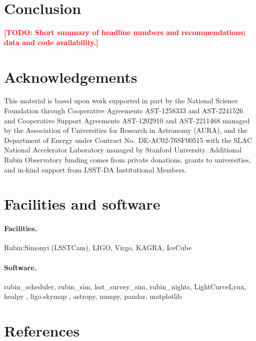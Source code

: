 \documentclass[OPS,lsstdraft,authoryear,toc]{lsstdoc}
\newcommand{\todo}[1]{\textcolor{red}{\textbf{[TODO: #1]}}}
\begin{document}
\section{Conclusion}\label{sec:conclusion}
\todo{Short summary of headline numbers and recommendations; data and code availability.}

\appendix

\section{Acknowledgements}

This material is based upon work supported in part by the National Science Foundation through Cooperative Agreements AST-1258333 and AST-2241526 and Cooperative Support Agreements AST-1202910 and AST-2211468 managed by the Association of Universities for Research in Astronomy (AURA), and the Department of Energy under Contract No.\ DE-AC02-76SF00515 with the SLAC National Accelerator Laboratory managed by Stanford University.
Additional Rubin Observatory funding comes from private donations, grants to universities, and in-kind support from LSST-DA Institutional Members.


\section{Facilities and software}

\paragraph{Facilities.} Rubin:Simonyi (LSSTCam), LIGO, Virgo, KAGRA, IceCube

\paragraph{Software.} rubin\_scheduler, rubin\_sim, lsst\_survey\_sim, rubin\_nights, LightCurveLynx, healpy \citep{Zonca2019}, ligo.skymap \citep{Singer2016}, astropy, numpy, pandas, matplotlib


\section{References} \label{sec:bib}
\renewcommand{\refname}{} %

\end{document}
